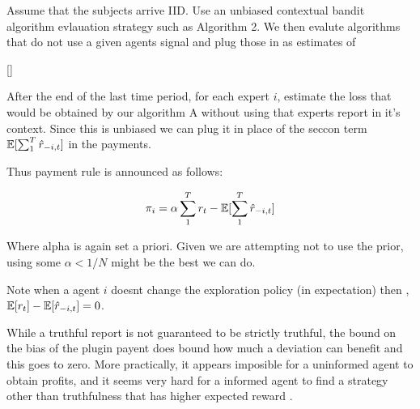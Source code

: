 Assume that the subjects arrive IID. Use an unbiased contextual bandit algorithm evlauation strategy such as \cite{li2011unbiased}  Algorithm 2. %
We then evalute algorithms that do not use a given agents signal and plug those in as estimates of 


\begin{mech}\label{mech:bandit}[]



After the end of the last time period, for each expert $i$, estimate the loss that would be obtained by our algorithm A without using that experts report in it's context. Since this is unbiased we can plug it in place of the seccon term $\operatorname*{\mathbb E}[\sum_1^T \hat{r}_{-i,t}]$ in the payments. 


Thus payment rule is announced as follows:

\[
    \pi_i =  \alpha \sum_1^T r_t -  \operatorname*{\mathbb E}[\sum_1^T \hat{r}_{-i,t}]
\]

Where alpha is again set a priori. Given we are attempting not to use the prior, using some $\alpha < 1/N$ might be the best we can do. 

\end{mech}


Note when a agent $i$ doesnt change the exploration policy (in expectation) then , $ \operatorname*{\mathbb E}[r_t] - \operatorname*{\mathbb E}[\hat{r}_{-i,t}] =0  $. 

While a truthful report is not guaranteed to be strictly truthful, the bound on the bias of the plugin payent does bound how much a deviation can benefit  and this goes to zero. More practically, it appears imposible for a uninformed agent to obtain profits, and it seems very hard for a informed agent to find a strategy other than truthfulness that has higher expected reward .








